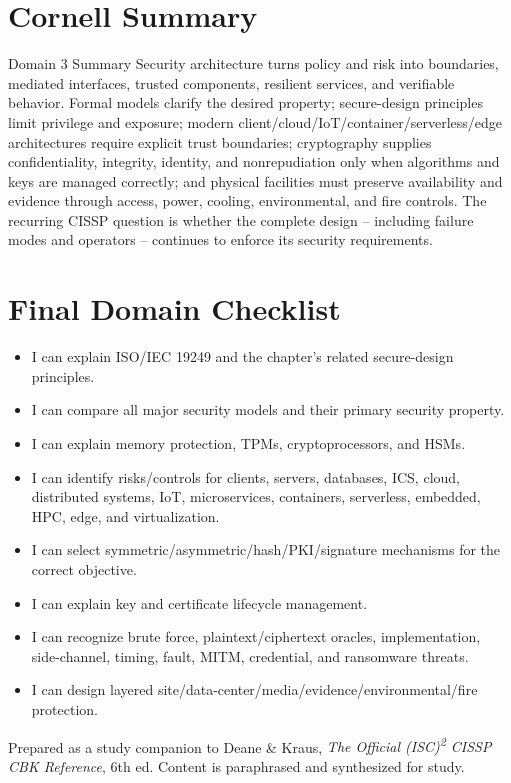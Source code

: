 \documentclass[10pt,letterpaper]{article}
\begin{document}
\section{\color{navy}Cornell Summary}
\begin{summarybox}{Domain 3 Summary}
Security architecture turns policy and risk into boundaries, mediated interfaces, trusted components, resilient services, and verifiable behavior. Formal models clarify the desired property; secure-design principles limit privilege and exposure; modern client/cloud/IoT/container/serverless/edge architectures require explicit trust boundaries; cryptography supplies confidentiality, integrity, identity, and nonrepudiation only when algorithms and keys are managed correctly; and physical facilities must preserve availability and evidence through access, power, cooling, environmental, and fire controls. The recurring CISSP question is whether the complete design -- including failure modes and operators -- continues to enforce its security requirements.
\end{summarybox}

\section{\color{navy}Final Domain Checklist}
\begin{itemize}[label=\(\square\)]
\item I can explain ISO/IEC 19249 and the chapter's related secure-design principles.
\item I can compare all major security models and their primary security property.
\item I can explain memory protection, TPMs, cryptoprocessors, and HSMs.
\item I can identify risks/controls for clients, servers, databases, ICS, cloud, distributed systems, IoT, microservices, containers, serverless, embedded, HPC, edge, and virtualization.
\item I can select symmetric/asymmetric/hash/PKI/signature mechanisms for the correct objective.
\item I can explain key and certificate lifecycle management.
\item I can recognize brute force, plaintext/ciphertext oracles, implementation, side-channel, timing, fault, MITM, credential, and ransomware threats.
\item I can design layered site/data-center/media/evidence/environmental/fire protection.
\end{itemize}
\vfill
{\footnotesize\color{teal}Prepared as a study companion to Deane \& Kraus, \textit{The Official (ISC)\textsuperscript{2} CISSP CBK Reference}, 6th ed. Content is paraphrased and synthesized for study.}
\end{document}
